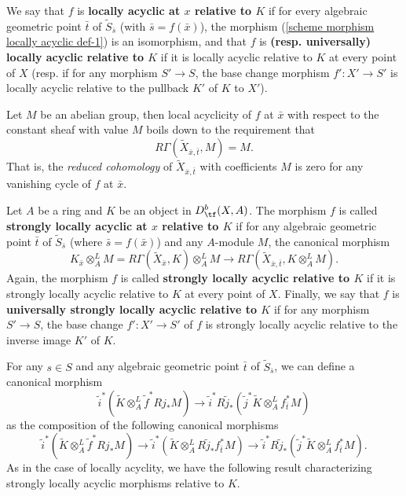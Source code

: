 We say that $f$ is \textbf{locally acyclic at $x$ relative to $K$} if for every algebraic geometric point $\bar{t}$ of $\widetilde{S}_{\bar{s}}$ (with $\bar{s}=f(\bar{x})$), the morphism (\ref{scheme morphism locally acyclic def-1}) is an isomorphism, and that $f$ is \textbf{(resp. universally) locally acyclic relative to $K$} if it is locally acyclic relative to $K$ at every point of $X$ (resp. if for any morphism $S'\to S$, the base change morphism $f':X'\to S'$ is locally acyclic relative to the pullback $K'$ of $K$ to $X'$).

\begin{example}\label{scheme morphism locally acyclic relative to constant char}
Let $M$ be an abelian group, then local acyclicity of $f$ at $\bar{x}$ with respect to the constant sheaf with value $M$ boils down to the requirement that
\[R\Gamma(\widetilde{X}_{\bar{x},\bar{t}},M)=M.\]
That is, the \textit{reduced cohomology} of $\widetilde{X}_{\bar{x},\bar{t}}$ with coefficients $M$ is zero for any vanishing cycle of $f$ at $\bar{x}$.
\end{example}

Let $A$ be a ring and $K$ be an object in $D^b_{\tf}(X,A)$. The morphism $f$ is called \textbf{strongly locally acyclic at $x$ relative to $K$} if for any algebraic geometric point $\bar{t}$ of $\widetilde{S}_{\bar{s}}$ (where $\bar{s}=f(\bar{x})$) and any $A$-module $M$, the canonical morphism
\[K_{\bar{x}}\otimes_A^LM=R\Gamma(\widetilde{X}_{\bar{x}},K)\otimes_A^LM\to R\Gamma(\widetilde{X}_{\bar{x},\bar{t}},K\otimes_A^LM).\]
Again, the morphism $f$ is called \textbf{strongly locally acyclic relative to $K$} if it is strongly locally acyclic relative to $K$ at every point of $X$. Finally, we say that $f$ is \textbf{universally strongly locally acyclic relative to $K$} if for any morphism $S'\to S$, the base change $f':X'\to S'$ of $f$ is strongly locally acyclic relative to the inverse image $K'$ of $K$.\par

For any $s\in S$ and any algebraic geometric point $\bar{t}$ of $\widetilde{S}_{\bar{s}}$, we can define a canonical morphism
\[\tilde{i}^*(\widetilde{K}\otimes_A^L\tilde{f}^*Rj_*M)\to \tilde{i}^*R\tilde{j}_*(\tilde{j}^*\widetilde{K}\otimes_A^Lf_{\bar{t}}^*M)\]
as the composition of the following canonical morphisms
\[\tilde{i}^*(\widetilde{K}\otimes_A^L\tilde{f}^*Rj_*M)\to \tilde{i}^*(\widetilde{K}\otimes_A^LR\tilde{j}_*f_{\bar{t}}^*M)\to \tilde{i}^*R\tilde{j}_*(\tilde{j}^*\widetilde{K}\otimes_A^Lf_{\bar{t}}^*M).\]
As in the case of locally acyclity, we have the following result characterizing strongly locally acyclic morphisms relative to $K$.

